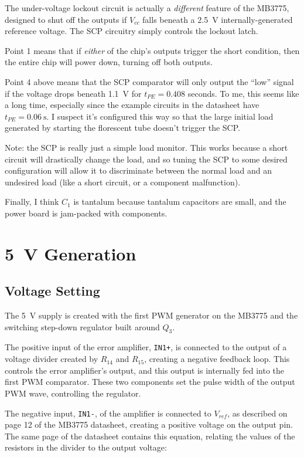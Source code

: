 \documentclass{article}
\newcommand{\Vcc}{$V_{cc}$}
\newcommand{\Vref}{$V_{ref}$}
\newcommand{\chippin}{\texttt}
\newcommand{\model}{\textsf}
\begin{document}
The under-voltage lockout circuit is actually a \emph{different}
feature of the \model{MB3775}, designed to shut off the outputs if
\Vcc{} falls beneath a \qty{2.5}{\volt} internally-generated reference
voltage. The SCP circuitry simply controls the lockout latch.

Point 1 means that if \emph{either} of the chip's outputs trigger the
short condition, then the entire chip will power down, turning off
both outputs.

Point 4 above means that the SCP comparator will only output the
``low'' signal if the voltage drops beneath \qty{1.1}{\volt} for
$t_{PE} = 0.408$ seconds. To me, this seems like a long time,
especially since the example circuits in the datasheet have
$t_{PE} = \qty{0.06}{\second}$. I suspect it's configured this way so
that the large initial load generated by starting the florescent tube
doesn't trigger the SCP.

Note: the SCP is really just a simple load monitor. This works because
a short circuit will drastically change the load, and so tuning the
SCP to some desired configuration will allow it to discriminate
between the normal load and an undesired load (like a short circuit, or
a component malfunction).

Finally, I think $C_1$ is tantalum because tantalum capacitors are
small, and the power board is jam-packed with components.

\section{\qty{5}{\volt} Generation}
\subsection{Voltage Setting}
The \qty{5}{\volt} supply is created with the first PWM generator on
the \model{MB3775} and the switching step-down regulator built around $Q_3$.

The positive input of the error amplifier, \chippin{IN1+}, is
connected to the output of a voltage divider created by $R_{14}$ and
$R_{15}$, creating a negative feedback loop. This controls the error
amplifier's output, and this output is internally fed into the first
PWM comparator. These two components set the pulse width of the output
PWM wave, controlling the regulator.

The negative input, \chippin{IN1-}, of the amplifier is connected to
\Vref, as described on page 12 of the \model{MB3775} datasheet, creating a
positive voltage on the output pin. The same page of the datasheet
contains this equation, relating the values of the resistors in the
divider to the output voltage:
\end{document}
